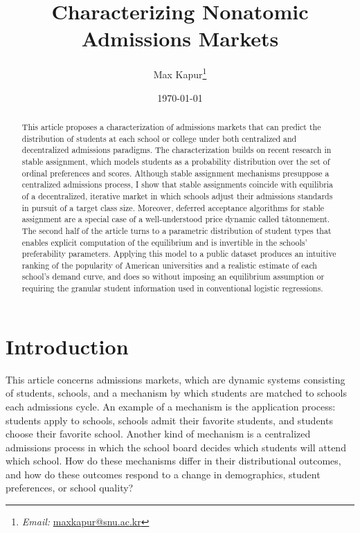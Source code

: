 \documentclass[12pt]{article}
\numberwithin{equation}{subsection}
\theoremstyle{definition}
\begin{document}
\title{Characterizing Nonatomic Admissions Markets}
\date{\today}
\author{Max Kapur\footnote{\emph{Email:} \href{mailto:maxkapur@snu.ac.kr}{maxkapur@snu.ac.kr}}}



\maketitle

\begin{abstract}
This article proposes a characterization of admissions markets that can predict the distribution of students at each school or college under both centralized and decentralized admissions paradigms. The characterization builds on recent research in stable assignment, which models students as a probability distribution over the set of ordinal preferences and scores. Although stable assignment mechanisms presuppose a centralized admissions process, I show that stable assignments coincide with equilibria of a decentralized, iterative market in which schools adjust their admissions standards in pursuit of a target class size. Moreover, deferred acceptance algorithms for stable assignment are a special case of a well-understood price dynamic called t\^{a}tonnement. The second half of the article turns to a parametric distribution of student types that enables explicit computation of the equilibrium and is invertible in the schools' preferability parameters. Applying this model to a public dataset produces an intuitive ranking of the popularity of American universities and a realistic estimate of each school's demand curve, and does so without imposing an equilibrium assumption or requiring the granular student information used in conventional logistic regressions.
\end{abstract}

\pagebreak
\tableofcontents

\pagebreak
\section{Introduction}
This article concerns admissions markets, which are dynamic systems consisting of students, schools, and a mechanism by which students are matched to schools each admissions cycle. An example of a mechanism is the application process: students apply to schools, schools admit their favorite students, and students choose their favorite school. Another kind of mechanism is a centralized admissions process in which the school board decides which students will attend which school. How do these mechanisms differ in their distributional outcomes, and how do these outcomes respond to a change in demographics, student preferences, or school quality?
\end{document}
